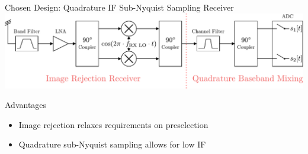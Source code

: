 \documentclass[10pt]{beamer}
\begin{document}
\begin{frame}{Chosen Design: \newline Quadrature IF Sub-Nyquist Sampling Receiver}
  \includegraphics[width=\textwidth]{figures/rx_3_bd} \\

  \begin{block}{Advantages}
    \begin{itemize}
    \item Image rejection relaxes requirements on preselection
    \item Quadrature sub-Nyquist sampling allows for low IF
    \end{itemize}
  \end{block}
\end{frame}
\end{document}
